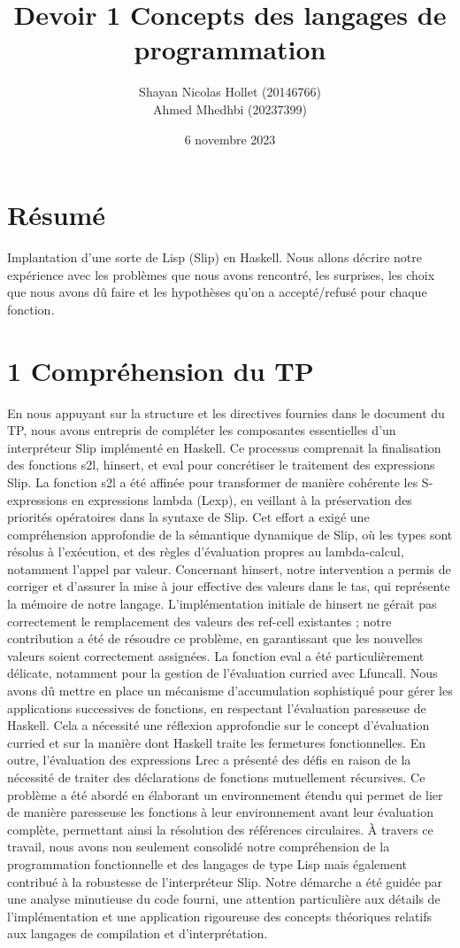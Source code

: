\documentclass[10pt]{article}
\title{Devoir 1 
 Concepts des langages de programmation }
\author{Shayan Nicolas Hollet (20146766)\\
Ahmed Mhedhbi (20237399)}
\date{6 novembre 2023}
\begin{document}
\maketitle

\section*{Résumé}
Implantation d'une sorte de Lisp (Slip) en Haskell. Nous allons décrire notre expérience avec les problèmes que nous avons rencontré, les surprises, les choix que nous avons dû faire et les hypothèses qu'on a accepté/refusé pour chaque fonction.

\section*{1 Compréhension du TP}
En nous appuyant sur la structure et les directives fournies dans le document du TP, nous avons entrepris de compléter les composantes essentielles d'un interpréteur Slip implémenté en Haskell. Ce processus comprenait la finalisation des fonctions s2l, hinsert, et eval pour concrétiser le traitement des expressions Slip. La fonction s2l a été affinée pour transformer de manière cohérente les S-expressions en expressions lambda (Lexp), en veillant à la préservation des priorités opératoires dans la syntaxe de Slip. Cet effort a exigé une compréhension approfondie de la sémantique dynamique de Slip, où les types sont résolus à l'exécution, et des règles d'évaluation propres au lambda-calcul, notamment l'appel par valeur. Concernant hinsert, notre intervention a permis de corriger et d'assurer la mise à jour effective des valeurs dans le tas, qui représente la mémoire de notre langage. L'implémentation initiale de hinsert ne gérait pas correctement le remplacement des valeurs des ref-cell existantes ; notre contribution a été de résoudre ce problème, en garantissant que les nouvelles valeurs soient correctement assignées. La fonction eval a été particulièrement délicate, notamment pour la gestion de l'évaluation curried avec Lfuncall. Nous avons dû mettre en place un mécanisme d'accumulation sophistiqué pour gérer les applications successives de fonctions, en respectant l'évaluation paresseuse de Haskell. Cela a nécessité une réflexion approfondie sur le concept d'évaluation curried et sur la manière dont Haskell traite les fermetures fonctionnelles. En outre, l'évaluation des expressions Lrec a présenté des défis en raison de la nécessité de traiter des déclarations de fonctions mutuellement récursives. Ce problème a été abordé en élaborant un environnement étendu qui permet de lier de manière paresseuse les fonctions à leur environnement avant leur évaluation complète, permettant ainsi la résolution des références circulaires. À travers ce travail, nous avons non seulement consolidé notre compréhension de la programmation fonctionnelle et des langages de type Lisp mais également contribué à la robustesse de l'interpréteur Slip. Notre démarche a été guidée par une analyse minutieuse du code fourni, une attention particulière aux détails de l'implémentation et une application rigoureuse des concepts théoriques relatifs aux langages de compilation et d'interprétation.
\end{document}
